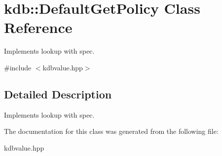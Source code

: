 \hypertarget{classkdb_1_1DefaultGetPolicy}{\section{kdb\-:\-:Default\-Get\-Policy Class Reference}
\label{classkdb_1_1DefaultGetPolicy}
}


Implements lookup with spec.  




{\ttfamily \#include $<$kdbvalue.\-hpp$>$}



\subsection{Detailed Description}
Implements lookup with spec. 

The documentation for this class was generated from the following file\-:\begin{DoxyCompactItemize}
\item 
kdbvalue.\-hpp\end{DoxyCompactItemize}
